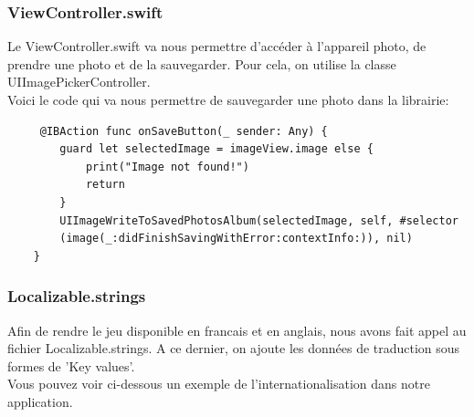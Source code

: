 \documentclass{article}
\begin{document}
\newpage
\subsubsection{ViewController.swift}
Le ViewController.swift va nous permettre d'accéder à l'appareil photo, de prendre une photo et de la sauvegarder. Pour cela, on utilise la classe UIImagePickerController.\\
Voici le code qui va nous permettre de sauvegarder une photo dans la librairie: 
\begin{verbatim}
     @IBAction func onSaveButton(_ sender: Any) {
        guard let selectedImage = imageView.image else {
            print("Image not found!")
            return
        }
        UIImageWriteToSavedPhotosAlbum(selectedImage, self, #selector
        (image(_:didFinishSavingWithError:contextInfo:)), nil)
    }
\end{verbatim}

\subsubsection{Localizable.strings}
Afin de rendre le jeu disponible en francais et en anglais, nous avons fait appel au fichier Localizable.strings. A ce dernier, on ajoute les données de traduction sous formes de 'Key values'.\\
Vous pouvez voir ci-dessous un exemple de l'internationalisation dans notre application.
\end{document}
